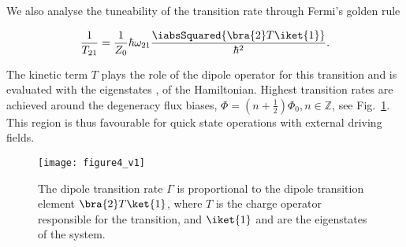 
 We also analyse the tuneability of the  \ra {} transition rate through Fermi's golden rule 

 \begin{equation}\label{eqn:goldenRule}
	\frac{1}{T_{21}} = \frac{1}{Z_0}\hbar\omega_{21}\frac{\iabsSquared{\bra{2}T\iket{1}}}{\hbar^2}.
 \end{equation}

 \noindent The kinetic term $ T $ plays the role of the dipole operator for this transition and is evaluated with the eigenstates ,  of the Hamiltonian. Highest transition rates are achieved around the degeneracy flux biases, $ \Phi = (n+\frac{1}{2})\Phi_0, n\in\mathbb{Z} $, see Fig.~\ref{fig:dipole_transition}. This region is thus favourable for quick state operations with external driving fields.
 
 \begin{figure}
	\centering
 		\texttt{[image: figure4\_v1]}
 	\caption{The dipole transition rate $ \Gamma $ is proportional to the dipole transition element $ \bra{2}T\ket{1} $, where $ T $ is the charge operator responsible for the transition, and $ \iket{1} $ and  are the eigenstates of the system. %
 		\label{fig:dipole_transition}}
 \end{figure}
